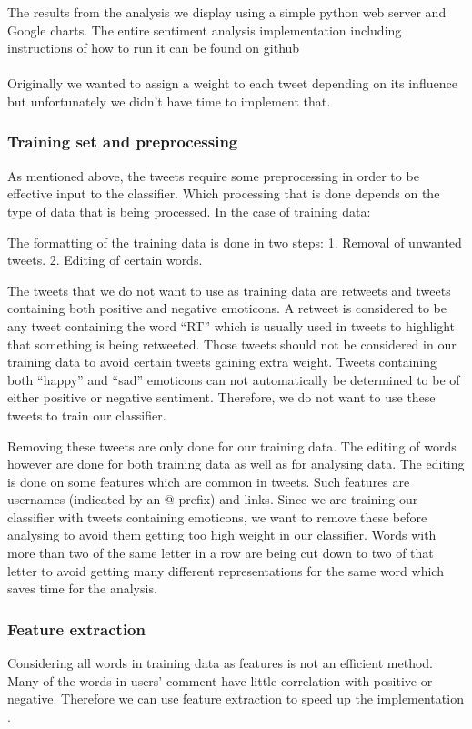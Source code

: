 \documentclass[a4paper]{article}
\begin{document}
The results from the analysis we display using a simple python web server and Google charts. The entire sentiment analysis implementation including instructions of how to run it can be found on github \cite{github}
\\
\\
Originally we wanted to assign a weight to each tweet depending on its influence but unfortunately we didn’t have time to implement that.

\subsubsection{Training set and preprocessing}
As mentioned above, the tweets require some preprocessing in order to be effective input to the classifier. 
Which processing that is done depends on the type of data that is being processed. In the case of training data:

 The formatting of the training data is done in two steps:
1. Removal of unwanted tweets.
2. Editing of certain words.

The tweets that we do not want to use as training data are retweets and tweets containing both positive and negative emoticons. A retweet is considered to be any tweet containing the word “RT” which is usually used in tweets to highlight that something is being retweeted. Those tweets should not be considered in our training data to avoid certain tweets gaining extra weight.
Tweets containing both “happy” and “sad” emoticons can not automatically be determined to be of either positive or negative sentiment. Therefore, we do not want to use these tweets to train our classifier.  

Removing these tweets are only done for our training data. The editing of words however are done for both training data as well as for analysing data. The editing is done on some features which are common in tweets. Such features are usernames (indicated by an @-prefix) and links. Since we are training our classifier with tweets containing emoticons, we want to remove these before analysing to avoid them getting too high weight in our classifier. 
Words with more than two of the same letter in a row are being cut down to two of that letter to avoid getting many different representations for the same word which saves time for the analysis.

\subsubsection{Feature extraction}
Considering all words in training data as features is not an efficient method. Many of the words in users’ comment have little correlation with positive or negative. Therefore we can use feature extraction to speed up the implementation \cite{elim_features}.
\end{document}

